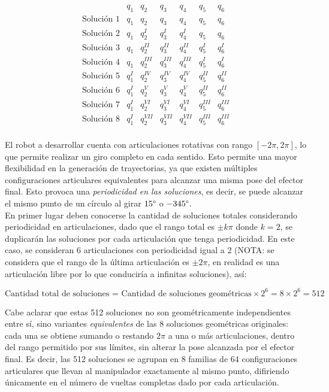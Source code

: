 \documentclass{article}
\begin{document}
\[
\begin{array}{c|cccccc}
 & q_1 & q_2 & q_3 & q_4 & q_5 & q_6 \\ \hline

\text{Solución 1} & q_1 & q_2 & q_3 & q_4 & q_5 & q_6 \\
\text{Solución 2} & q_1 & q_2^{I} & q_3^{I} & q_4^{I} & q_5 & q_6 \\
\text{Solución 3} & q_1 & q_2^{II} & q_3^{II} & q_4^{II} & q_5^{I} & q_6^{I} \\
\text{Solución 4} & q_1 & q_2^{III} & q_3^{III} & q_4^{III} & q_5^{I} & q_6^{I} \\
\text{Solución 5} & q_1^{I} & q_2^{IV} & q_3^{IV} & q_4^{IV} & q_5^{II} & q_6^{II} \\
\text{Solución 6} & q_1^{I} & q_2^{V} & q_3^{V} & q_4^{V} & q_5^{II} & q_6^{II} \\
\text{Solución 7} & q_1^{I} & q_2^{VI} & q_3^{VI} & q_4^{VI} & q_5^{III} & q_6^{III} \\
\text{Solución 8} & q_1^{I} & q_2^{VII} & q_3^{VII} & q_4^{VII} & q_5^{III} & q_6^{III} \\
\end{array}
\]

El robot a desarrollar cuenta con articulaciones rotativas con rango $[-2\pi,2\pi]$, lo que permite realizar un giro completo en cada sentido. Esto permite una mayor flexibilidad en la generación de trayectorias, ya que existen múltiples configuraciones articulares equivalentes para alcanzar una misma pose del efector final. Esto provoca una \textit{periodicidad en las soluciones}, es decir, se puede alcanzar el mismo punto de un círculo al girar $15\degree$ o $-345\degree$.\\

En primer lugar deben conocerse la cantidad de soluciones totales considerando periodicidad en articulaciones, dado que el rango total es $\pm k\pi$ donde $k=2$, se duplicarán las soluciones por cada articulación que tenga periodicidad. En este caso, se consideran 6 articulaciones con periodicidad igual a 2 (NOTA: se considera que el rango de la última articulación es $\pm2\pi$, en realidad es una articulación libre por lo que conduciría a infinitas soluciones), así:

\begin{equation}
    \text{Cantidad total de soluciones = Cantidad de soluciones geométricas}\times2^6=8\times2^6 = 512
\end{equation}

Cabe aclarar que estas 512 soluciones no son geométricamente independientes entre sí, sino variantes \textit{equivalentes} de las 8 soluciones geométricas originales: cada una se obtiene sumando o restando $2\pi$ a una o más articulaciones, dentro del rango permitido por sus límites, sin alterar la pose alcanzada por el efector final. Es decir, las 512 soluciones se agrupan en 8 familias de 64 configuraciones articulares que llevan al manipulador exactamente al mismo punto, difiriendo únicamente en el número de vueltas completas dado por cada articulación.
\end{document}
